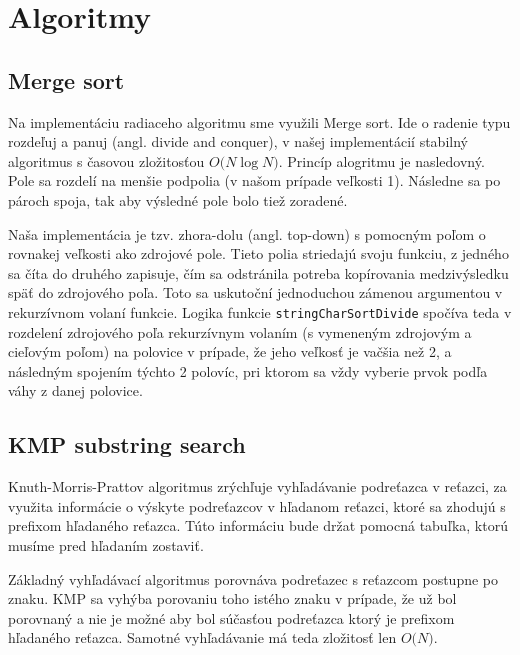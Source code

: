 \documentclass[12pt,a4paper,titlepage,final]{article}
\newcommand{\BigO}[1]{\ensuremath{O\bigl(#1\bigr)}}
\begin{document}
\section{Algoritmy} \label{Algoritmy}

\subsection{Merge sort}
Na implementáciu radiaceho algoritmu sme využili Merge sort. Ide o radenie
 typu rozdeľuj a panuj (angl. divide and conquer), v našej implementácií stabilný
 algoritmus s časovou zložitosťou \BigO{N \log{N}}. Princíp alogritmu je nasledovný.
 Pole sa rozdelí na menšie podpolia (v našom prípade veľkosti 1). Následne sa
 po pároch spoja, tak aby výsledné pole bolo tiež zoradené.

Naša implementácia je tzv. zhora-dolu (angl. top-down) s pomocným poľom o
 rovnakej veľkosti ako zdrojové pole. Tieto polia striedajú svoju funkciu, z
 jedného sa číta do druhého zapisuje, čím sa odstránila potreba kopírovania
 medzivýsledku späť do zdrojového poľa. Toto sa uskutoční jednoduchou
 zámenou argumentou v rekurzívnom volaní funkcie. Logika funkcie \texttt{stringCharSortDivide}
 spočíva teda v rozdelení zdrojového poľa rekurzívnym
 volaním (s vymeneným zdrojovým a cieľovým poľom) na polovice v prípade, že jeho
 veľkosť je vačšia než 2, a následným spojením týchto 2 polovíc, pri ktorom sa
 vždy vyberie prvok podľa váhy z danej polovice.

\subsection{KMP substring search}
Knuth-Morris-Prattov algoritmus zrýchľuje vyhľadávanie podreťazca v reťazci, za
 využita informácie o výskyte podreťazcov v hľadanom reťazci, ktoré sa
 zhodujú s prefixom hľadaného reťazca. Túto informáciu bude držat pomocná
 tabuľka, ktorú musíme pred hľadaním zostaviť.

Základný vyhľadávací algoritmus porovnáva podreťazec s reťazcom postupne po
 znaku. KMP sa vyhýba porovaniu toho istého znaku v prípade, že už bol
 porovnaný a nie je možné aby bol súčasťou podreťazca
 ktorý je prefixom hľadaného reťazca. Samotné vyhľadávanie má teda zložitosť
 len \BigO{N}.
\end{document}
